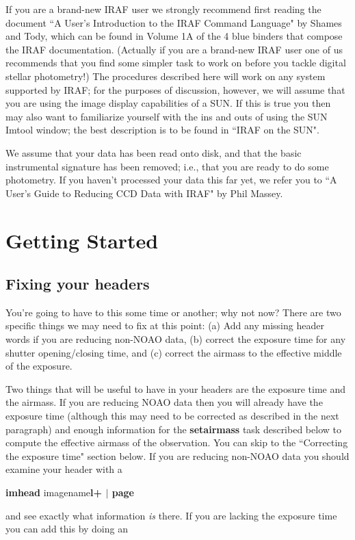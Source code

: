 If you are a brand-new IRAF user we strongly recommend first reading the
document ``A User's Introduction to the IRAF
Command Language" by Shames and Tody, which can be found in Volume 1A
of the 4 blue binders that compose the IRAF documentation. (Actually
if you are a brand-new IRAF user one of us recommends that you find
some simpler task to work on before you tackle digital stellar photometry!)
The procedures described here will work on any system supported by IRAF;
for the purposes of discussion, however, we will assume that you are
using the image display capabilities of a SUN.  If this is true you then
may also want to familiarize yourself with the ins and outs of using
the SUN Imtool window; the best description is to be found in ``IRAF
on the SUN".
 
We assume that your data has been read onto disk, and that the basic
instrumental signature has been removed; i.e., that you are ready
to do some photometry.  If you haven't processed your
data this far yet, we
refer you to ``A User's Guide to Reducing CCD Data with IRAF" by Phil
Massey.
 
\section{Getting Started}
 
\subsection{Fixing your headers}
You're going to have to this some time or another; why not now?  There
are two specific things we may need to fix at this point: (a) Add any
missing header words if you are reducing non-NOAO data, (b) correct the
exposure time for any shutter opening/closing time, and (c) correct the
airmass to the effective middle of the exposure.
 
Two things that will be useful to have in your headers are the exposure
time and the airmass.  If you are reducing NOAO data then you will
already have the exposure time (although this may need to be corrected
as described in the next paragraph) and enough information for the {\bf
setairmass} task described below to compute the effective airmass of the
observation.  You can skip to the ``Correcting the exposure time"
section below.
If
you are reducing non-NOAO data you should examine your header with a
 
\centerline{ {\bf imhead} imagename{\bf l+ $|$ page} }
 
\noindent
and see exactly what information {\it is} there.  If you are lacking the
exposure time you can add this by doing an
 
